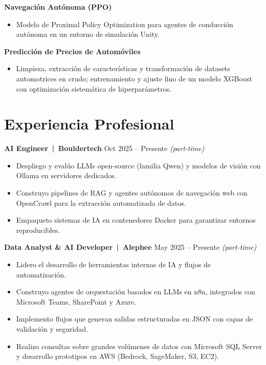 \documentclass[a4paper,11pt]{article}
\begin{document}
\textbf{Navegación Autónoma (PPO)}
\begin{itemize}
    \item Modelo de Proximal Policy Optimization para agentes de conducción autónoma en un entorno de simulación Unity.
\end{itemize}

\textbf{Predicción de Precios de Automóviles}
\begin{itemize}
    \item Limpieza, extracción de características y transformación de datasets automotrices en crudo; entrenamiento y ajuste fino de un modelo XGBoost con optimización sistemática de hiperparámetros.
\end{itemize}

\section*{Experiencia Profesional}

\textbf{AI Engineer \,|\, Bouldertech} \hfill Oct 2025 -- Presente \emph{(part-time)}
\begin{itemize}
    \item Despliego y evalúo LLMs open-source (familia Qwen) y modelos de visión con Ollama en servidores dedicados.
    \item Construyo pipelines de RAG y agentes autónomos de navegación web con OpenCrawl para la extracción automatizada de datos.
    \item Empaqueto sistemas de IA en contenedores Docker para garantizar entornos reproducibles.
\end{itemize}

\textbf{Data Analyst \& AI Developer \,|\, Alephee} \hfill May 2025 -- Presente \emph{(part-time)}
\begin{itemize}
    \item Lidero el desarrollo de herramientas internas de IA y flujos de automatización.
    \item Construyo agentes de orquestación basados en LLMs en n8n, integrados con Microsoft Teams, SharePoint y Azure.
    \item Implemento flujos que generan salidas estructuradas en JSON con capas de validación y seguridad.
    \item Realizo consultas sobre grandes volúmenes de datos con Microsoft SQL Server y desarrollo prototipos en AWS (Bedrock, SageMaker, S3, EC2).
\end{itemize}
\end{document}
